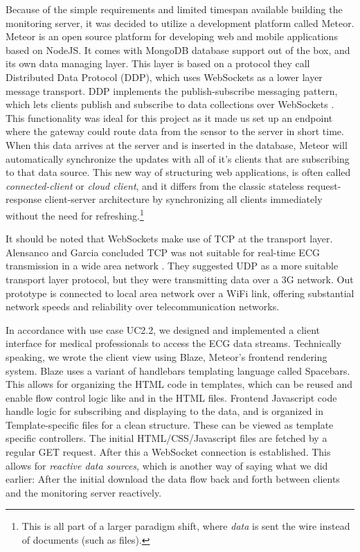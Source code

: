 
Because of the simple requirements and limited timespan available building the monitoring server, it was decided to utilize a development platform called Meteor. Meteor \cite{meteor} is an open source platform for developing web and mobile applications based on NodeJS. It comes with MongoDB database support out of the box, and its own data managing layer. This layer is based on a protocol they call Distributed Data Protocol (DDP), which uses WebSockets as a lower layer message transport. DDP implements the publish-subscribe messaging pattern, which lets clients publish and subscribe to data collections over WebSockets \cite{ddp:github}. This functionality was ideal for this project as it made us set up an endpoint where the gateway could route data from the sensor to the server in short time. When this data arrives at the server and is inserted in the database, Meteor will automatically synchronize the updates with all of it's clients that are subscribing to that data source. This new way of structuring web applications, is often called \textit{connected-client} or \textit{cloud client}, and it differs from the classic stateless request-response client-server architecture by synchronizing all clients immediately without the need for refreshing.\footnote{ This is all part of a larger paradigm shift, where \textit{data} is sent the wire instead of documents (such as files).}

It should be noted that WebSockets make use of TCP at the transport layer. Alensanco and Garcia concluded TCP was not suitable for real-time ECG transmission in a wide area network \cite{Alesanco:2010kc}. They suggested UDP as a more suitable transport layer protocol, but they were transmitting data over a 3G network. Out prototype is connected to local area network over a WiFi link, offering substantial network speeds and reliability over telecommunication networks.

In accordance with use case \textsc{UC2.2}, we designed and implemented a client interface for medical professionals to access the ECG data streams. Technically speaking, we wrote the client view using Blaze, Meteor's frontend rendering system. Blaze uses a variant of handlebars templating language\cite{handlebars} called Spacebars. This allows for organizing the HTML code in templates, which can be reused and enable flow control logic like  and  in the HTML files. Frontend Javascript code handle logic for subscribing and displaying to the data, and is organized in Template-specific files for a clean structure. These can be viewed as template specific controllers. The initial HTML/CSS/Javascript files are fetched by a regular GET request. After this a WebSocket connection is established. This allows for \textit{reactive data sources}, which is another way of saying what we did earlier: After the initial download the data flow back and forth between clients and the monitoring server reactively.

